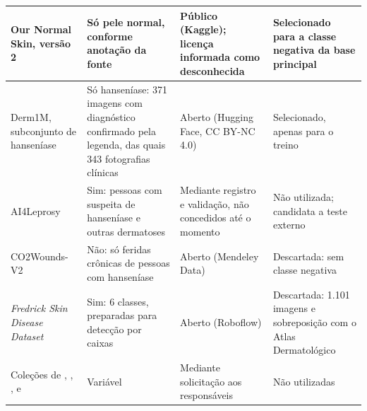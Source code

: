 \begin{longtable}{|>{\raggedright\arraybackslash}p{3.4cm}|>{\raggedright\arraybackslash}p{4.2cm}|>{\raggedright\arraybackslash}p{3.4cm}|>{\raggedright\arraybackslash}p{3.6cm}|}
	Our Normal Skin, versão 2 \cite{ourNormalSkin2023}                                                                                            & Só pele normal, conforme anotação da fonte                                                             & Público (Kaggle); licença informada como desconhecida       & Selecionado para a classe negativa da base principal               \\ \hline
	Derm1M, subconjunto de hanseníase \cite{yan2025derm1m}                                                                                        & Só hanseníase: 371 imagens com diagnóstico confirmado pela legenda, das quais 343 fotografias clínicas & Aberto (Hugging Face, CC BY-NC 4.0)                         & Selecionado, apenas para o treino                                  \\ \hline
	AI4Leprosy \cite{barbieri2022}                                                                                                                & Sim: pessoas com suspeita de hanseníase e outras dermatoses                                            & Mediante registro e validação, não concedidos até o momento & Não utilizada; candidata a teste externo                           \\ \hline
	CO2Wounds-V2 \cite{co2woundsDados2024}                                                                                                        & Não: só feridas crônicas de pessoas com hanseníase                                                     & Aberto (Mendeley Data)                                      & Descartada: sem classe negativa                                    \\ \hline
	\textit{Fredrick Skin Disease Dataset} \cite{fredrickSkinDisease2025}                                                                         & Sim: 6 classes, preparadas para detecção por caixas                                                    & Aberto (Roboflow)                                           & Descartada: 1.101 imagens e sobreposição com o Atlas Dermatológico \\ \hline
	Coleções de \citeonline{deps2026}, \citeonline{yotsu2023}, \citeonline{jitendra2024deep}, \citeonline{banerjee2023} e \citeonline{nyatte2022} & Variável                                                                                               & Mediante solicitação aos responsáveis                       & Não utilizadas                                                     \\ \hline
\end{longtable}
\endgroup
{}

